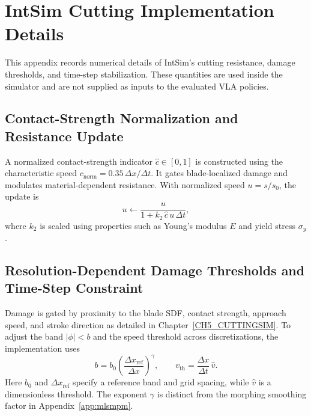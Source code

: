 \setlength{\emergencystretch}{1.5em}

\clearpage
\chapter{IntSim Cutting Implementation Details}
\label{app:cutting-impl}

\renewcommand{\theequation}{\thechapter.\arabic{equation}}
\setcounter{equation}{0}

This appendix records numerical details of IntSim's cutting resistance, damage thresholds, and time-step stabilization. These quantities are used inside the simulator and are not supplied as inputs to the evaluated VLA policies.

\section{Contact-Strength Normalization and Resistance Update}
\label{app:cut-contact-resistance}

A normalized contact-strength indicator $\hat c\in[0,1]$ is constructed using the characteristic speed $c_{\mathrm{norm}}=0.35\,\Delta x/\Delta t$. It gates blade-localized damage and modulates material-dependent resistance. With normalized speed $u=s/s_0$, the update is
\begin{equation}\label{eq:cut_resistance}
  u\leftarrow\frac{u}{1+k_2\,\hat c\,u\,\Delta t},
\end{equation}
where $k_2$ is scaled using properties such as Young's modulus $E$ and yield stress $\sigma_y$.

\section{Resolution-Dependent Damage Thresholds and Time-Step Constraint}
\label{app:cut-resolution-cfl}

Damage is gated by proximity to the blade SDF, contact strength, approach speed, and stroke direction as detailed in Chapter~\ref{CH5_CUTTINGSIM}. To adjust the band $|\phi|<b$ and the speed threshold across discretizations, the implementation uses
\begin{equation}\label{eq:cut_resolution_scaling}
  b=b_0\left(\frac{\Delta x_{\mathrm{ref}}}{\Delta x}\right)^\gamma,
  \qquad
  v_{\mathrm{th}}=\frac{\Delta x}{\Delta t}\,\hat v.
\end{equation}
Here $b_0$ and $\Delta x_{\mathrm{ref}}$ specify a reference band and grid spacing, while $\hat v$ is a dimensionless threshold. The exponent $\gamma$ is distinct from the morphing smoothing factor in Appendix~\ref{app:mlsmpm}.

